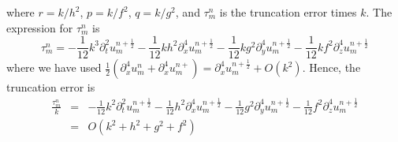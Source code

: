 where $r = k/h^2$, $p = k/f^2$, $q = k/g^2$, and $\tau_m^n$ is the truncation error times $k$. The expression for $\tau_m^n$ is
\begin{equation*}
\tau_m^n = -\frac{1}{12} k^3 \partial_t^2 u_m^{n+\frac{1}{2}} - \frac{1}{12} k h^2 \partial_x^4 u_m^{n+\frac{1}{2}} - \frac{1}{12} k g^2 \partial_y^4 u_m^{n+\frac{1}{2}} - \frac{1}{12} k f^2 \partial_z^4 u_m^{n+\frac{1}{2}}
\end{equation*}
where we have used $\frac{1}{2}(\partial_x^4 u_m^n + \partial_x^4 u_m^{n+}) = \partial_x^4 u_m^{n+\frac{1}{2}} + O(k^2)$. Hence, the truncation error is 
\begin{eqnarray*}
\frac{\tau_m^ n}{k} &=& -\frac{1}{12} k^2 \partial_t^2 u_m^{n+\frac{1}{2}} - \frac{1}{12} h^2 \partial_x^4 u_m^{n+\frac{1}{2}} - \frac{1}{12} g^2 \partial_y^4 u_m^{n+\frac{1}{2}} - \frac{1}{12} f^2 \partial_z^4 u_m^{n+\frac{1}{2}}\\
					&=& O(k^2 + h^2 + g^2 + f^2)
\end{eqnarray*}

